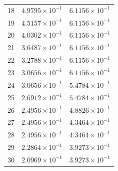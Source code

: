 \begin{table}[H]
\begin{tabular}{@{}rrr@{}}
18 & $4.9795\times10^{-1}$ & $6.1156\times10^{-1}$\\
19 & $4.5157\times10^{-1}$ & $6.1156\times10^{-1}$\\
20 & $4.0302\times10^{-1}$ & $6.1156\times10^{-1}$\\
21 & $3.6487\times10^{-1}$ & $6.1156\times10^{-1}$\\
22 & $3.2788\times10^{-1}$ & $6.1156\times10^{-1}$\\
23 & $3.0656\times10^{-1}$ & $6.1156\times10^{-1}$\\
24 & $3.0656\times10^{-1}$ & $5.4784\times10^{-1}$\\
25 & $2.6912\times10^{-1}$ & $5.4784\times10^{-1}$\\
26 & $2.4956\times10^{-1}$ & $4.8826\times10^{-1}$\\
27 & $2.4956\times10^{-1}$ & $4.3464\times10^{-1}$\\
28 & $2.4956\times10^{-1}$ & $4.3464\times10^{-1}$\\
29 & $2.2864\times10^{-1}$ & $3.9273\times10^{-1}$\\
30 & $2.0969\times10^{-1}$ & $3.9273\times10^{-1}$\\
\bottomrule
\end{tabular}
\end{table}

